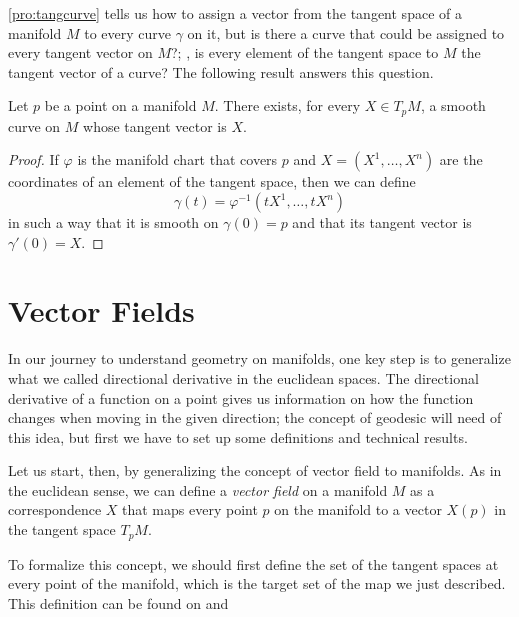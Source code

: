 \autoref{pro:tangcurve} tells us how to assign a vector from the tangent space of a manifold $M$ to every curve $\gamma$ on it, but is there a curve that could be assigned to every tangent vector on $M$?; \ie, is every element of the tangent space to $M$ the tangent vector of a curve? The following result answers this question.

\begin{theorem}
	Let $p$ be a point on a manifold $M$. There exists, for every $X \in T_p M$, a smooth curve on $M$ whose tangent vector is $X$.
\end{theorem}

\begin{proof}
	If $\varphi$ is the manifold chart that covers $p$ and $X = (X^1, \dots, X^n)$ are the coordinates of an element of the tangent space, then we can define
	\[
		\gamma(t) = \varphi^{-1}(tX^1, \dots, tX^n)
	\]
	in such a way that it is smooth on $\gamma(0) = p$ and that its tangent vector is $\gamma'(0) = X$.
\end{proof}

\section{Vector Fields}

In our journey to understand geometry on manifolds, one key step is to generalize what we called directional derivative in the euclidean spaces. The directional derivative of a function on a point gives us information on how the function changes when moving in the given direction; the concept of geodesic will need of this idea, but first we have to set up some definitions and technical results.

Let us start, then, by generalizing the concept of vector field to manifolds. As in the euclidean sense, we can define a \emph{vector field} on a manifold $M$ as a correspondence $X$ that maps every point $p$ on the manifold to a vector $X(p)$ in the tangent space $T_p M$.

To formalize this concept, we should first define the set of the tangent spaces at every point of the manifold, which is the target set of the map we just described. This definition can be found on \cite[p. 26]{oneill83} and \cite[p. 13]{docarmo79}

